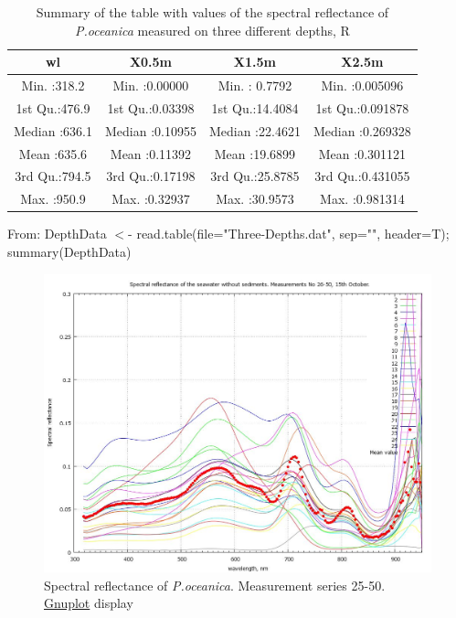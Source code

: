 \documentclass[10pt, a4paper]{article}
\begin{document}
\begin{appendices}
\begin{table}[H]
\end{table}
\pagebreak

\begin{table}[htbp]
	\caption{Summary of the table with values of the spectral reflectance of \textit{P.oceanica} measured on three different depths, R}
	\begin{center}
	\begin{tabular}{|c|c|c|c|}
		\hline\hline
		wl & X0.5m & X1.5m & X2.5m\\ \hline\hline
		Min.   :318.2   &  Min.   :0.00000     &   Min.   : 0.7792     &   Min.   :0.005096  \\ \hline
		 1st Qu.:476.9   &  1st Qu.:0.03398    &  1st Qu.:14.4084    &  1st Qu.:0.091878  \\ \hline
		 Median :636.1   &   Median :0.10955    &  Median :22.4621   &  Median :0.269328 \\ \hline 
		 Mean   :635.6   &   Mean   :0.11392   &   Mean   :19.6899   &  Mean   :0.301121  \\ \hline
		 3rd Qu.:794.5   &   3rd Qu.:0.17198   &   3rd Qu.:25.8785    &  3rd Qu.:0.431055 \\ \hline  
		 Max.   :950.9     &  Max.   :0.32937    &  Max.   :30.9573   &   Max.   :0.981314  \\ \hline
	\end{tabular}
	\end{center}
		From: DepthData $<$- read.table(file="Three-Depths.dat", sep="", header=T); summary(DepthData)
	\label{tab:17}
\end{table}

\begin{figure}[H]
	\begin{center}
		\includegraphics[scale=0.25]{GNU-11.jpg}
		\caption{Spectral reflectance of \textit{P.oceanica}. Measurement series 25-50. \\ \href{http://www.gnuplot.info/}{Gnuplot} display­}
		\label{fig:A.25}
	\end{center}
\end{figure}
\pagebreak


\end{appendices}
\end{document}
